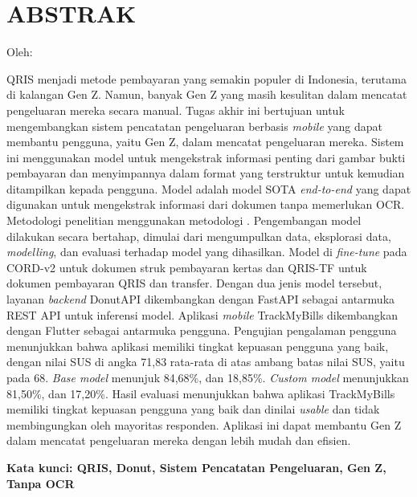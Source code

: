 \clearpage
\chapter*{ABSTRAK}
\begin{center}
	\center
	\begin{singlespace}
		\large\bfseries{\thetitle}

		\normalfont\normalsize
		Oleh:

		\bfseries \theauthor
	\end{singlespace}
\end{center}

\begin{singlespace}
	QRIS menjadi metode pembayaran yang semakin populer di Indonesia, terutama di kalangan Gen Z. Namun, banyak Gen Z yang masih kesulitan dalam mencatat pengeluaran mereka secara manual. Tugas akhir ini bertujuan untuk mengembangkan sistem pencatatan pengeluaran berbasis \emph{mobile} yang dapat membantu pengguna, yaitu Gen Z, dalam mencatat pengeluaran mereka. Sistem ini menggunakan model \donut{} untuk mengekstrak informasi penting dari gambar bukti pembayaran dan menyimpannya dalam format yang terstruktur untuk kemudian ditampilkan kepada pengguna. Model \donut{} adalah model SOTA \emph{end-to-end} yang dapat digunakan untuk mengekstrak informasi dari dokumen tanpa memerlukan OCR. Metodologi penelitian menggunakan metodologi \dsrm. Pengembangan model dilakukan secara bertahap, dimulai dari mengumpulkan data, eksplorasi data, \emph{modelling}, dan evaluasi terhadap model yang dihasilkan. Model \donut{} di \emph{fine-tune} pada \dataset{} CORD-v2 untuk dokumen struk pembayaran kertas dan \dataset{} QRIS-TF untuk dokumen pembayaran QRIS dan transfer. Dengan dua jenis model tersebut, layanan \emph{backend} DonutAPI dikembangkan dengan FastAPI sebagai antarmuka REST API untuk inferensi model. Aplikasi \emph{mobile} TrackMyBills dikembangkan dengan Flutter sebagai antarmuka pengguna. Pengujian pengalaman pengguna menunjukkan bahwa aplikasi memiliki tingkat kepuasan pengguna yang baik, dengan nilai SUS di angka 71,83 rata-rata di atas ambang batas nilai SUS, yaitu pada 68.  \emph{Base model} menunjuk \fscore{} 84,68\%, dan \mcer{} 18,85\%. \emph{Custom model} menunjukkan  \fscore{} 81,50\%, dan \mcer{} 17,20\%. Hasil evaluasi menunjukkan bahwa aplikasi TrackMyBills memiliki tingkat kepuasan pengguna yang baik dan dinilai \emph{usable} dan tidak membingungkan oleh mayoritas responden. Aplikasi ini dapat membantu Gen Z dalam mencatat pengeluaran mereka dengan lebih mudah dan efisien.

	\textbf{Kata kunci: QRIS, Donut, Sistem Pencatatan Pengeluaran, Gen Z, Tanpa OCR}

\end{singlespace}
\clearpage
